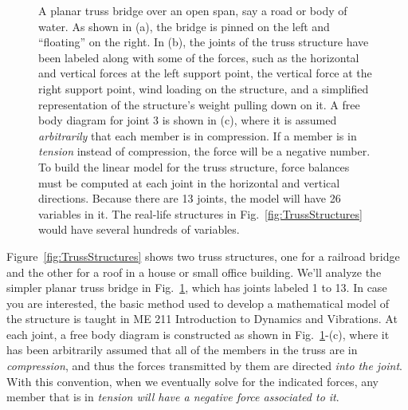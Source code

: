 \begin{figure}[hbt!]%
\centering
{}%
\hspace{5pt}%
%
\hspace{5pt}%
%
    \caption[]{A planar truss bridge over an open span, say a road or body of water. As shown in (a), the bridge is pinned on the left and ``floating'' on the right. In (b), the joints of the truss structure have been labeled along with some of the forces, such as the horizontal and vertical forces at the left support point, the vertical force at the right support point, wind loading on the structure, and a simplified representation of the structure's weight pulling down on it. A free body diagram for joint 3 is shown in (c), where it is assumed \textit{arbitrarily} that each member is in compression. If a member is in \textit{tension} instead of compression, the force will be a negative number. To build the linear model for the truss structure, force balances must be computed at each joint in the horizontal and vertical directions. Because there are 13 joints, the model will have 26 variables in it. The real-life structures in Fig.~\ref{fig:TrussStructures} would have several hundreds of variables.}
    \label{fig:TrussBridgeCartoons}
\end{figure}

Figure~\ref{fig:TrussStructures} shows two truss structures, one for a railroad bridge and the other for a roof in a house or small office building. We'll analyze the simpler planar truss bridge in Fig.~\ref{fig:TrussBridgeCartoons},  which has joints labeled 1 to 13. In case you are interested, the basic method used to develop a mathematical model of the structure is taught in ME 211 Introduction to Dynamics and Vibrations. At each joint, a free body diagram is constructed as shown in Fig.~\ref{fig:TrussBridgeCartoons}-(c), where it has been arbitrarily assumed that all of the members in the truss are in \textit{compression}, and thus the forces transmitted by them are directed \textit{into the joint}. With this convention, when we eventually solve for the indicated forces, any member that is in \textit{tension will have a negative force associated to it}. \\

